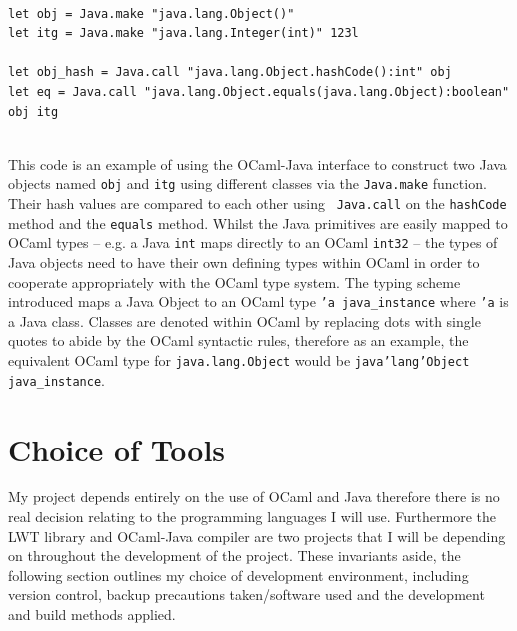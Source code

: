 \documentclass[12pt,twoside,notitlepage]{report}
\begin{document}
\hfill\\
\begin{lstlisting}
let obj = Java.make "java.lang.Object()"
let itg = Java.make "java.lang.Integer(int)" 123l

let obj_hash = Java.call "java.lang.Object.hashCode():int" obj
let eq = Java.call "java.lang.Object.equals(java.lang.Object):boolean" obj itg
\end{lstlisting}
\hfill\\
This code is an example of using the OCaml-Java interface to construct two Java objects named {\tt obj} and {\tt itg} using different classes via the {\tt Java.make} function. Their hash values are compared to each other using {\tt
Java.call} on the {\tt hashCode} method and the {\tt equals} method.  Whilst the Java primitives are easily mapped to OCaml types -- e.g. a Java {\tt int} maps directly to an OCaml {\tt int32} -- the types of Java objects need to have
their own defining types within OCaml in order to cooperate appropriately with the OCaml type system. The typing scheme introduced maps a Java Object to an OCaml type {\tt 'a java\_instance} where {\tt 'a} is a Java class.  Classes
are denoted within OCaml by replacing dots with single quotes to abide by the OCaml syntactic rules\cite{web:clerc2013}, therefore as an example, the equivalent OCaml type for {\tt java.lang.Object} would be {\tt java'lang'Object
java\_instance}.

\section{Choice of Tools}
\label{sec:choice_of_tools}
%
%
My project depends entirely on the use of OCaml and Java therefore there is no real decision relating to the programming languages I will use. Furthermore the LWT library and OCaml-Java compiler are two projects that I will be
depending on throughout the development of the project. These invariants aside, the following section outlines my choice of development environment, including version control, backup precautions taken/software used and the development
and build methods applied.
\end{document}
